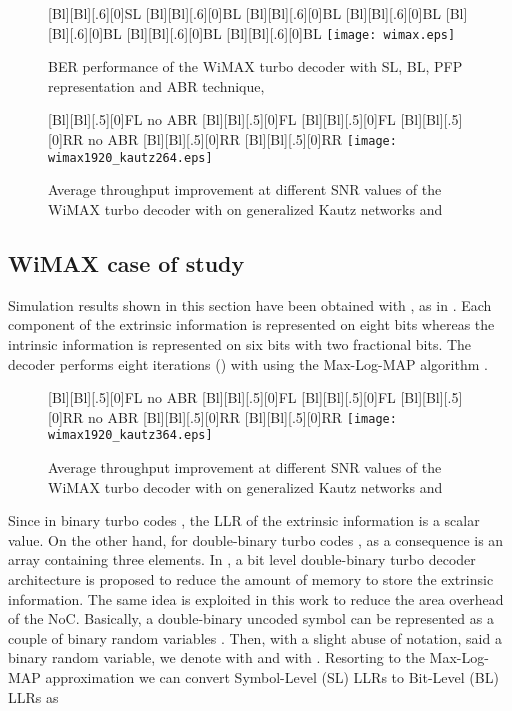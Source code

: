 \documentclass[10pt,twocolumn,journal]{IEEEtran}
\begin{document}
\begin{figure}[t!]
  \centering
  [Bl][Bl][.6][0]{SL}
  [Bl][Bl][.6][0]{BL}
  [Bl][Bl][.6][0]{BL }
  [Bl][Bl][.6][0]{BL }
  [Bl][Bl][.6][0]{BL }
  [Bl][Bl][.6][0]{BL  }
  [Bl][Bl][.6][0]{BL  }
  \texttt{[image: wimax.eps]}
\caption{BER performance of the WiMAX  turbo decoder with SL, BL, PFP representation and ABR technique, } 
\label{fig:wimax}
\end{figure}
\begin{figure}[t!]
    \centering
      [Bl][Bl][.5][0]{FL no ABR}
      [Bl][Bl][.5][0]{FL }
      [Bl][Bl][.5][0]{FL }
      [Bl][Bl][.5][0]{RR no ABR}
      [Bl][Bl][.5][0]{RR }
      [Bl][Bl][.5][0]{RR }
      \texttt{[image: wimax1920\_kautz264.eps]}
\caption{Average throughput improvement at different SNR values of the WiMAX  turbo decoder with  
on generalized Kautz networks  and }
\label{fig:ABR_wimax_1920_2}
\end{figure}

\subsection{WiMAX case of study} 

Simulation results shown in this section have been obtained with , as in \cite{kim_TCASII09}. 
Each component of the extrinsic information is represented on eight bits whereas the intrinsic information is 
represented on six bits with two fractional bits. The decoder performs eight iterations () with  using the Max-Log-MAP 
algorithm \cite{robertson_ETT97}.
\begin{figure}[t!]
    \centering
      [Bl][Bl][.5][0]{FL no ABR}
      [Bl][Bl][.5][0]{FL }
      [Bl][Bl][.5][0]{FL }
      [Bl][Bl][.5][0]{RR no ABR}
      [Bl][Bl][.5][0]{RR }
      [Bl][Bl][.5][0]{RR }
      \texttt{[image: wimax1920\_kautz364.eps]}
\caption{Average throughput improvement at different SNR values of the WiMAX  turbo decoder with  
on generalized Kautz networks  and }
\label{fig:ABR_wimax_1920_3}
\end{figure}

Since in binary turbo codes , the LLR of the extrinsic information is a scalar value. 
On the other hand, for double-binary turbo codes , as a consequence  
 is an array containing three elements. In \cite{kim_TCASII09}, a bit level double-binary 
turbo decoder architecture is proposed to reduce the amount of memory to store the extrinsic information. 
The same idea is exploited in this work to reduce the area overhead of the NoC. Basically, a double-binary 
uncoded symbol  can be represented as a couple of binary random variables . Then, with a slight abuse 
of notation, said  a binary random variable, we denote  with  and  with . Resorting to the Max-Log-MAP approximation we can convert Symbol-Level (SL) LLRs to Bit-Level (BL) LLRs as
\end{document}
